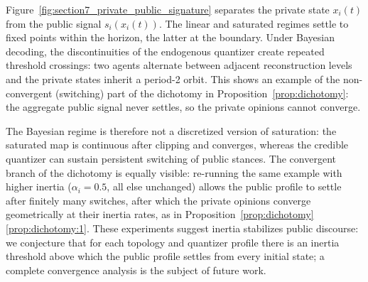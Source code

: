 \documentclass[journal,twoside,web]{ieeecolor}
\begin{document}
Figure~\ref{fig:section7_private_public_signature} separates the private state $x_i(t)$ from the public signal $s_i(x_i(t))$. The linear and saturated regimes settle to fixed points within the horizon, the latter at the boundary. Under Bayesian decoding, the discontinuities of the endogenous quantizer create repeated threshold crossings: two agents alternate between adjacent reconstruction levels and the private states inherit a period-2 orbit. This shows an example of the non-convergent (switching) part of the dichotomy in Proposition~\ref{prop:dichotomy}: the aggregate public signal never settles, so the private opinions cannot converge.

The Bayesian regime is therefore not a discretized version of saturation: the saturated map is continuous after clipping and converges, whereas the credible quantizer can sustain persistent switching of public stances. The convergent branch of the dichotomy is equally visible: re-running the same example with higher inertia ($\alpha_i=0.5$, all else unchanged) allows the public profile to settle after finitely many switches, after which the private opinions converge geometrically at their inertia rates, as in Proposition~\ref{prop:dichotomy}\ref{prop:dichotomy:1}. These experiments suggest inertia stabilizes public discourse: we conjecture that for each topology and quantizer profile there is an inertia threshold above which the public profile settles from every initial state; a complete convergence analysis is the subject of future work.
\end{document}

